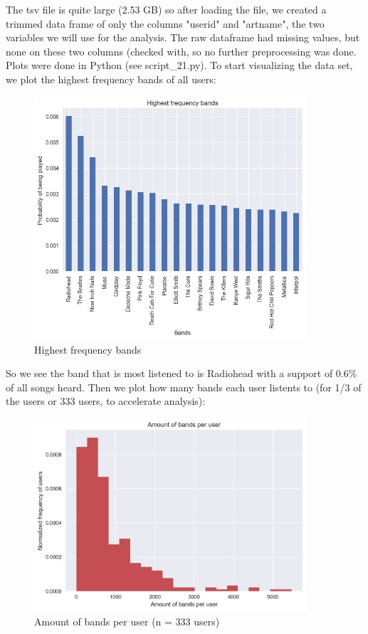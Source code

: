 \documentclass[a4paper]{article}
\begin{document}
	The tsv file is quite large (2.53 GB) so after loading the file, we created a trimmed data frame of only the columns "userid" and "artname", the two variables we will use for the analysis. The raw dataframe had missing values, but none on these two columns (checked with, so no further preprocessing was done. Plots were done in Python (see script\_21.py). To start visualizing the data set, we plot the highest frequency bands of all users:
	\begin{figure}[ht!]
		\centering
		\includegraphics[width=0.9\textwidth]{images/highest_freq_bands.png}
		\caption{Highest frequency bands}
	\end{figure}
	\newline
	So we see the band that is most listened to is Radiohead with a support of 0.6\% of all songs heard. 
	\newline
	\newline
	Then we plot how many bands each user listents to (for 1/3 of the users or 333 users, to accelerate analysis):
	\begin{figure}[ht!]
		\centering
		\includegraphics[width=0.9\textwidth]{images/bands_per_user.png}
		\caption{Amount of bands per user (n = 333 users)}
	\end{figure}
\end{document}
